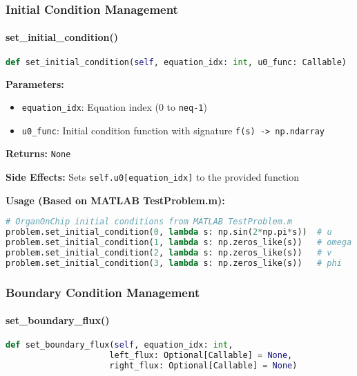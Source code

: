 \subsubsection{Initial Condition Management}

\paragraph{set\_initial\_condition()}\leavevmode
\begin{lstlisting}[language=Python, caption=Set Initial Condition Method]
def set_initial_condition(self, equation_idx: int, u0_func: Callable)
\end{lstlisting}

\textbf{Parameters:}
\begin{itemize}
    \item \texttt{equation\_idx}: Equation index (0 to \texttt{neq-1})
    \item \texttt{u0\_func}: Initial condition function with signature \texttt{f(s) -> np.ndarray}
\end{itemize}

\textbf{Returns:} \texttt{None}

\textbf{Side Effects:} Sets \texttt{self.u0[equation\_idx]} to the provided function

\textbf{Usage (Based on MATLAB TestProblem.m):}
\begin{lstlisting}[language=Python, caption=Initial Condition Usage]
# OrganOnChip initial conditions from MATLAB TestProblem.m
problem.set_initial_condition(0, lambda s: np.sin(2*np.pi*s))  # u
problem.set_initial_condition(1, lambda s: np.zeros_like(s))   # omega
problem.set_initial_condition(2, lambda s: np.zeros_like(s))   # v
problem.set_initial_condition(3, lambda s: np.zeros_like(s))   # phi
\end{lstlisting}

\subsubsection{Boundary Condition Management}

\paragraph{set\_boundary\_flux()}
\begin{lstlisting}[language=Python, caption=Set Boundary Flux Method]
def set_boundary_flux(self, equation_idx: int, 
                     left_flux: Optional[Callable] = None,
                     right_flux: Optional[Callable] = None)
\end{lstlisting}

